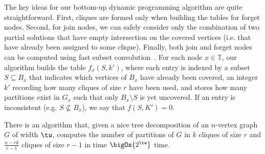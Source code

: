 The key ideas for our bottom-up dynamic programming algorithm are quite straightforward. First, cliques are formed only when building the tables for forget nodes. Second, for join nodes, we can safely consider only the combination of two partial solutions that have empty intersection on the covered vertices (i.e. that have already been assigned to some clique). Finally, both join and forget nodes can be computed using fast subset convolution~\citep{fourier_mobius}.
For each node $x \in \mathbb{T}$, our algorithm builds the table $f_x(S, k')$, where each entry is indexed by a subset $S \subseteq B_x$ that indicates which vertices of $B_x$ have already been covered, an integer $k'$ recording how many cliques of size $r$ have been used, and stores how many partitions exist in $G_x$ such that only $B_x \setminus S$ is yet uncovered.
If an entry is inconsistent (e.g. $S \nsubseteq B_x$), we say that $f(S, K') = 0$.

\begin{theorem}
    \label{thm:clique_part}
    There is an algorithm that, given a nice tree decomposition of an $n$-vertex graph $G$ of width $\tw$, computes the number of partitions of $G$ in $k$ cliques of size $r$ and $\frac{n - rk}{r-1}$ cliques of size $r-1$ in time $\bigOs{2^{\tw}}$ time.
\end{theorem}

